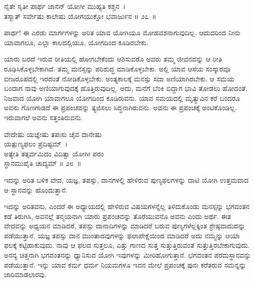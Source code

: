 \begin{shloka}
ನೈತೇ ಸೃತೀ ಪಾರ್ಥ ಜಾನನ್ ಯೋಗೀ ಮುಹ್ಯತಿ ಕಶ್ಚನ~।\\ತಸ್ಮಾತ್ ಸರ್ವೇಷು ಕಾಲೇಷು ಯೋಗಯುಕ್ತೋ ಭವಾರ್ಜುನ \hfill॥ ೨೭~॥
\end{shloka}

\begin{artha}
ಪಾರ್ಥ! ಈ ಎರಡು ಮಾರ್ಗಗಳನ್ನು ಅರಿತ ಯಾವ ಯೋಗಿಯೂ ಮೋಹವಶನಾಗುವುದಿಲ್ಲ. ಆದುದರಿಂದ ನೀನು ಯಾವಾಗಲೂ, ಎಲ್ಲಾ ಕಾಲದಲ್ಲಿಯೂ, ಯೋಗದಿಂದ ಕೂಡಿರಬೇಕು.
\end{artha}

ಯಾರು ಬರದೆ ಇರುವ ರೀತಿಯಲ್ಲಿ ಹೋಗಬೇಕೆಂದು ಆಶಿಸುವರೊ ಅವರು ತಮ್ಮ ಜೀವನವನ್ನು ಆ ರೀತಿ ರೂಢಿಸಿಕೊಳ್ಳಬೇಕಾಗಿದೆ. ತಮ್ಮ ಮನಸ್ಸನ್ನು ಪರಿಶುದ್ಧ ಮಾಡಿಕೊಳ್ಳಬೇಕು. ಅಲ್ಲಿ ಯಾವ ಆಸೆಯ ಸಂಸ್ಕಾರವೂ ಬೀಜರೂಪದಲ್ಲಿ ಇರದಂತೆ ನೋಡಿಕೊಳ್ಳಬೇಕು. ಅಂತ್ಯಕಾಲಕ್ಕೆ ಮನಸ್ಸು ಸದಾ ಅಣಿಯಾಗಿರಬೇಕು. ಆ ಸಮಯ ಬಂದಾಗ ನಾವು ಅಣಿಯಾಗುವುದಕ್ಕೆ ಹೊತ್ತಿರುವುದಿಲ್ಲ. ಅದು, ಮನೆಗೆ ಬೆಂಕಿ ಬಿದ್ದಾಗ ಭಾವಿ ತೋಡಲು ಹೋದಂತೆ. ನಿಜವಾದ ಯೋಗಿ ಯಾವಾಗಲೂ ಯೋಗದಿಂದ ಕೂಡಿರುವನು. ಯಾವ ಸಮಯದಲ್ಲಿ ಮೃತ್ಯುವಿನ ಕರೆ ಬಂದರೂ ಅವನು ಗೊಣಗಾಡದೆ ಈ ಪ್ರಪಂಚವನ್ನು ತ್ಯಜಿಸಲು ಸಿದ್ಧನಾಗಿರುವನು. ಅವನು ಈ ಪ್ರಪಂಚಕ್ಕೆ ಅಂಟಿಕೊಂಡಿಲ್ಲ. ಇರುವಾಗಲೆ ಅವನು ಸತ್ತಂತಿರುವನು.

\begin{shloka}
ವೇದೇಷು ಯಜ್ಞೇಷು ತಪಃಸು ಚೈವ ದಾನೇಷು\\ ಯತ್ಪುಣ್ಯಫಲಂ ಪ್ರದಿಷ್ಟಮ್~।\\ಅತ್ಯೇತಿ ತತ್ಸರ್ವಮಿದಂ ವಿದಿತ್ವಾ ಯೋಗೀ ಪರಂ\\ ಸ್ಥಾನಮುಪೈತಿ ಚಾದ್ಯಮ್ \hfill॥ ೨೮~॥
\end{shloka}

\begin{artha}
ಇದನ್ನು ಅರಿತ ಬಳಿಕ ವೇದ, ಯಜ್ಞ, ತಪಸ್ಸು, ದಾನಗಳಲ್ಲಿ ಹೇಳಿರುವ ಪುಣ್ಯಫಲಗಳನ್ನು ದಾಟಿ ಯೋಗಿ ಉತ್ತಮವಾದ ಆ ಸ್ಥಾನವನ್ನು ಹೊಂದುತ್ತಾನೆ. 
\end{artha}

ಇದನ್ನು ಅರಿತವನು, ಎಂದರೆ ಈ ಅಧ್ಯಾಯದಲ್ಲಿ ಹೇಳಿರುವ ವಿಷಯಗಳನ್ನೆಲ್ಲ ತಿಳಿದುಕೊಂಡು ಮನಸ್ಸನ್ನು ಭಗವಂತನ ಕಡೆ ತಿರುಗಿಸಿ, ಅವನಲ್ಲೆ ತನ್ಮಯನಾಗಿ ಯಾರು ಪ್ರಪಂಚವನ್ನು ತೊರೆಯುವನೊ ಅವನು ಎಂದು ಅರ್ಥ. ಈತ ವೇದವನ್ನು ಅಧ್ಯಯನ ಮಾಡಿದರೆ, ತಪಸ್ಸು ದಾನಾದಿಗಳನ್ನು ಮಾಡಿದರೆ ಬರುವ ಪುಣ್ಯಗಳೆಲ್ಲಕ್ಕಿಂತ ಶ್ರೇಷ್ಠವಾದುದನ್ನು ಪಡೆಯುತ್ತಾನೆ. ಯಜ್ಞ ತಪಸ್ಸು ದಾನ ಮುಂತಾದವುಗಳನ್ನು ಫಲಾಪೇಕ್ಷೆಯಿಂದ ಮಾಡಿದರೆ ಅದು ನಮ್ಮನ್ನು ಆಯಾ ಫಲಕ್ಕೆ ಕಟ್ಟಿಹಾಕುವುದು. ನಾವು ಆ ಫಲದ ಸುತ್ತಲೂ, ಎತ್ತು ಗಾಣದ ಸುತ್ತ ಸುತ್ತುತ್ತಿರುವಂತೆ ಸುತ್ತುತ್ತಿರಬೇಕಾಗುವುದು. ಅನನ್ಯ ಚಿತ್ತನಾಗಿ ಭಗವಂತನನ್ನು ಧ್ಯಾನಿಸುವ ಯೋಗಿ ಇವುಗಳನ್ನು ಮೀರಿಹೋಗುತ್ತಾನೆ. ಭಗವಂತನ ಪರಮಸ್ಥಾನವನ್ನು ಪಡೆಯುತ್ತಾನೆ. ಇನ್ನು ಯಾವ ಕರ್ಮ ಧರ್ಮ ನಿಯಮಗಳೂ ಇವನ ಮೇಲೆ ಪ್ರಪಂಚಕ್ಕೆ ಪುನಃ ಕರೆತರುವ ಸಮನ್ನನ್ನು ಜಾರಿಮಾಡಲಾರವು.

